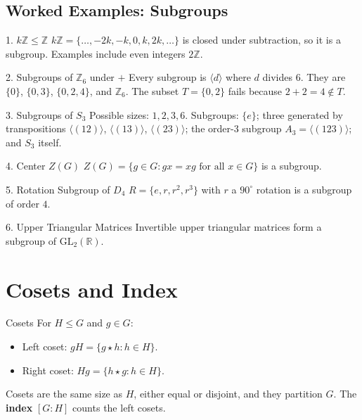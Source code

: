 \documentclass[12pt]{article}
\begin{document}
\subsection*{Worked Examples: Subgroups}
\begin{examplebox}{1. $k\mathbb{Z} \leq \mathbb{Z}$}
$k\mathbb{Z}=\{\ldots,-2k,-k,0,k,2k,\ldots\}$ is closed under subtraction, so it is a subgroup. Examples include even integers $2\mathbb{Z}$.
\end{examplebox}

\begin{examplebox}{2. Subgroups of $\mathbb{Z}_6$ under $+$}
Every subgroup is $\langle d\rangle$ where $d$ divides $6$. They are $\{0\}$, $\{0,3\}$, $\{0,2,4\}$, and $\mathbb{Z}_6$. The subset $T=\{0,2\}$ fails because $2+2=4\notin T$.
\end{examplebox}

\begin{examplebox}{3. Subgroups of $S_3$}
Possible sizes: $1,2,3,6$. Subgroups: $\{e\}$; three generated by transpositions $\langle(12)\rangle$, $\langle(13)\rangle$, $\langle(23)\rangle$; the order-3 subgroup $A_3=\langle(123)\rangle$; and $S_3$ itself.
\end{examplebox}

\begin{examplebox}{4. Center $Z(G)$}
$Z(G)=\{g\in G: gx=xg \text{ for all } x\in G\}$ is a subgroup.
\end{examplebox}

\begin{examplebox}{5. Rotation Subgroup of $D_4$}
$R=\{e,r,r^2,r^3\}$ with $r$ a $90^\circ$ rotation is a subgroup of order $4$.
\end{examplebox}

\begin{examplebox}{6. Upper Triangular Matrices}
Invertible upper triangular matrices form a subgroup of $\mathrm{GL}_2(\mathbb{R})$.
\end{examplebox}

\section*{Cosets and Index}
\begin{definitionbox}{Cosets}
For $H\leq G$ and $g\in G$:
\begin{itemize}
  \item Left coset: $gH=\{g\star h: h\in H\}$.
  \item Right coset: $Hg=\{h\star g: h\in H\}$.
\end{itemize}
Cosets are the same size as $H$, either equal or disjoint, and they partition $G$. The \textbf{index} $[G:H]$ counts the left cosets.
\end{definitionbox}
\end{document}

